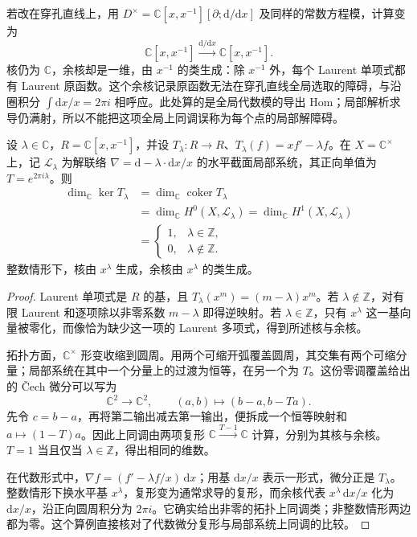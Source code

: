 \ProseParagraphBreak
若改在穿孔直线上，用 \(D^\times=\mathbb C[x,x^{-1}][\partial;\mathrm{d}/\mathrm{d}x]\) 及同样的常数方程模，计算变为
\[
	\mathbb C[x,x^{-1}]\xrightarrow{\mathrm{d}/\mathrm{d}x}\mathbb C[x,x^{-1}].
\]
核仍为 \(\mathbb C\)，余核却是一维，由 \(x^{-1}\) 的类生成：除 \(x^{-1}\) 外，每个 Laurent 单项式都有 Laurent 原函数。这个余核记录原函数无法在穿孔直线全局选取的障碍，与沿圈积分 \(\int \mathrm{d}x/x=2\pi i\) 相呼应。此处算的是全局代数模的导出 Hom；局部解析求导仍满射，所以不能把这项全局上同调误称为每个点的局部解障碍。

\begin{proposition}\label{b5:prop:D-laurent-monodromy-cohomology}
	设 \(\lambda\in\mathbb C\)，\(R=\mathbb C[x,x^{-1}]\)，并设 \(T_\lambda:R\to R\)、\(T_\lambda(f)=xf'-\lambda f\)。在 \(X=\mathbb C^\times\) 上，记 \(\mathcal L_\lambda\) 为解联络 \(\nabla=\mathrm{d}-\lambda\cdot\mathrm{d}x/x\) 的水平截面局部系统，其正向单值为 \(T=e^{2\pi i\lambda}\)。则
	\[
		\begin{aligned}
			\dim_{\mathbb C}\ker T_\lambda &=\dim_{\mathbb C}\operatorname{coker}T_\lambda\\
			&=\dim_{\mathbb C}H^0(X,\mathcal L_\lambda) =\dim_{\mathbb C}H^1(X,\mathcal L_\lambda)\\
			&=\begin{cases}1,&\lambda\in\mathbb Z,\\0,&\lambda\notin\mathbb Z.\end{cases}
		\end{aligned}
	\]
	整数情形下，核由 \(x^\lambda\) 生成，余核由 \(x^\lambda\) 的类生成。
\end{proposition}
\begin{proof}
	Laurent 单项式是 \(R\) 的基，且 \(T_\lambda(x^m)=(m-\lambda)x^m\)。若 \(\lambda\notin\mathbb Z\)，对有限 Laurent 和逐项除以非零系数 \(m-\lambda\) 即得逆映射。若 \(\lambda\in\mathbb Z\)，只有 \(x^\lambda\) 这一基向量被零化，而像恰为缺少这一项的 Laurent 多项式，得到所述核与余核。

	拓扑方面，\(\mathbb C^\times\) 形变收缩到圆周。用两个可缩开弧覆盖圆周，其交集有两个可缩分量；局部系统在其中一个分量上的过渡为恒等，在另一个为 \(T\)。这份零调覆盖给出的 Čech 微分可以写为
	\[
		\mathbb C^2\longrightarrow\mathbb C^2,\qquad (a,b)\longmapsto(b-a,b-Ta).
	\]
	先令 \(c=b-a\)，再将第二输出减去第一输出，便拆成一个恒等映射和 \(a\mapsto(1-T)a\)。因此上同调由两项复形 \(\mathbb C\xrightarrow{T-1}\mathbb C\) 计算，分别为其核与余核。\(T=1\) 当且仅当 \(\lambda\in\mathbb Z\)，得出相同的维数。

	在代数形式中，\(\nabla f=(f'-\lambda f/x)\,\mathrm{d}x\)；用基 \(\mathrm{d}x/x\) 表示一形式，微分正是 \(T_\lambda\)。整数情形下换水平基 \(x^\lambda\)，复形变为通常求导的复形，而余核代表 \(x^\lambda\,\mathrm{d}x/x\) 化为 \(\mathrm{d}x/x\)，沿正向圆周积分为 \(2\pi i\)。它确实给出非零的拓扑上同调类；非整数情形两边都为零。这个算例直接核对了代数微分复形与局部系统上同调的比较。
\end{proof}

